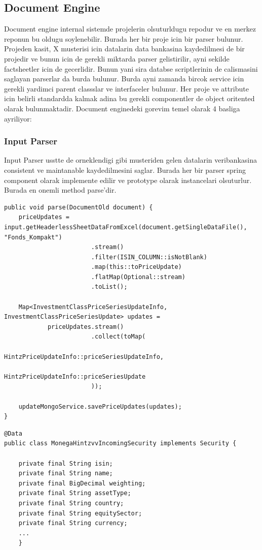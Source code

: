 \subsection{Document Engine}
Document engine internal sistemde projelerin olsuturldugu repodur ve en merkez reponun bu oldugu soylenebilir. Burada her bir proje icin bir parser bulunur. 
Projeden kasit, X musterisi icin datalarin data bankasina kaydedilmesi de bir projedir ve bunun icin de gerekli miktarda parser gelistirilir, ayni sekilde factsheetler icin de gecerlidir.
Bunun yani sira databse scriptlerinin de calismasini saglayan parserlar da burda bulunur. 
Burda ayni zamanda bircok service icin gerekli yardimci parent classslar ve interfaceler bulunur. Her proje ve attribute icin belirli standardda kalmak adina bu gerekli componentler de object oritented olarak bulunmaktadir.
Document enginedeki gorevim temel olarak 4 basliga ayriliyor:

\subsubsection{Input Parser}
Input Parser usstte de orneklendigi gibi musteriden gelen datalarin veribankasina consistent ve maintanable kaydedilmesini saglar. Burada her bir parser spring component olarak implemente edilir 
ve prototype olarak instancelari olsuturlur. Burada en onemli method parse\(\)'dir. 

\begin{lstlisting}[caption={method}]
public void parse(DocumentOld document) {
	priceUpdates = input.getHeaderlessSheetDataFromExcel(document.getSingleDataFile(), "Fonds_Kompakt")
		                .stream()
		                .filter(ISIN_COLUMN::isNotBlank)
		                .map(this::toPriceUpdate)
		                .flatMap(Optional::stream)
		                .toList();

	Map<InvestmentClassPriceSeriesUpdateInfo, InvestmentClassPriceSeriesUpdate> updates =
			priceUpdates.stream()
				        .collect(toMap(
						        HintzPriceUpdateInfo::priceSeriesUpdateInfo,
						        HintzPriceUpdateInfo::priceSeriesUpdate
				        ));

	updateMongoService.savePriceUpdates(updates);
}
\end{lstlisting}


\begin{lstlisting}[caption={Incoming Security}]
@Data
public class MonegaHintzvvIncomingSecurity implements Security {

	private final String isin;
	private final String name;
	private final BigDecimal weighting;
	private final String assetType;
	private final String country;
	private final String equitySector;
	private final String currency;
    ...
    }

\end{lstlisting}

